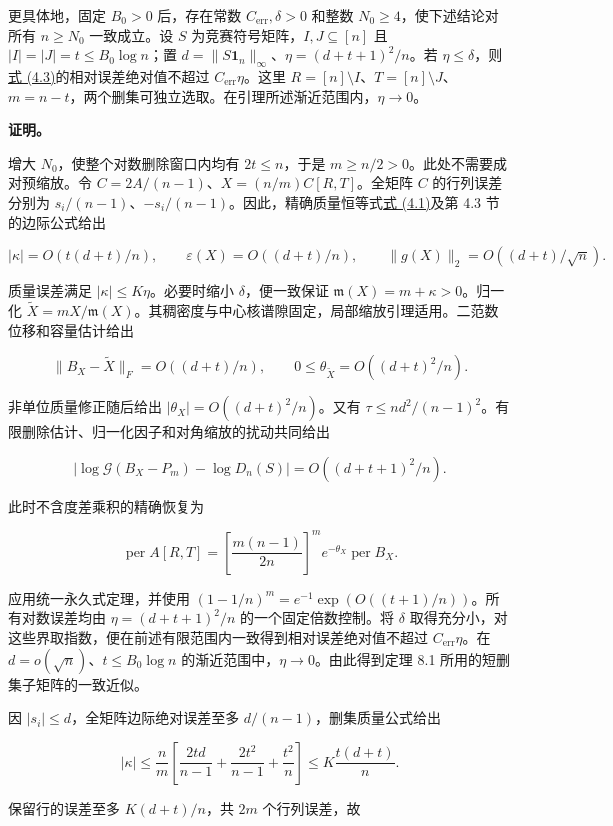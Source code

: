 \documentclass[11pt,a4paper]{article}
\begin{document}
更具体地，固定 \(B_0>0\) 后，存在常数 \(C_{\mathrm{err}},\delta>0\) 和整数 \(N_0\ge4\)，使下述结论对所有 \(n\ge N_0\) 一致成立。设 \(S\) 为竞赛符号矩阵，\(I,J\subseteq[n]\) 且 \(|I|=|J|=t\le B_0\log n\)；置 \(d=\|S\mathbf1_n\|_\infty\)、\(\eta=(d+t+1)^2/n\)。若 \(\eta\le\delta\)，则\hyperref[eq-small-score-permanent]{式 (4.3)}的相对误差绝对值不超过 \(C_{\mathrm{err}}\eta\)。这里 \(R=[n]\setminus I\)、\(T=[n]\setminus J\)、\(m=n-t\)，两个删集可独立选取。在引理所述渐近范围内，\(\eta\to0\)。

\textbf{证明。}

增大 \(N_0\)，使整个对数删除窗口内均有 \(2t\le n\)，于是 \(m\ge n/2>0\)。此处不需要成对预缩放。令 \(C=2A/(n-1)\)、\(X=(n/m)C[R,T]\)。全矩阵 \(C\) 的行列误差分别为 \(s_i/(n-1)\)、\(-s_i/(n-1)\)。因此，精确质量恒等式\hyperref[eq-deletion-mass]{式 (4.1)}及第 4.3 节的边际公式给出

\[
|\kappa|=O(t(d+t)/n),\qquad \varepsilon(X)=O((d+t)/n),\qquad \|g(X)\|_2=O((d+t)/\sqrt n).
\]

质量误差满足 \(|\kappa|\le K\eta\)。必要时缩小 \(\delta\)，便一致保证 \(\mathfrak m(X)=m+\kappa>0\)。归一化 \(\widetilde X=mX/\mathfrak m(X)\)。其稠密度与中心核谱隙固定，局部缩放引理适用。二范数位移和容量估计给出

\[
\|B_X-\widetilde X\|_F=O((d+t)/n),\qquad 0\le\theta_{\widetilde X}=O((d+t)^2/n).
\]

非单位质量修正随后给出 \(|\theta_X|=O((d+t)^2/n)\)。又有 \(\tau\le nd^2/(n-1)^2\)。有限删除估计、归一化因子和对角缩放的扰动共同给出

\[
|\log\mathcal G(B_X-P_m)-\log D_n(S)|=O((d+t+1)^2/n).
\]

此时不含度差乘积的精确恢复为

\[
\operatorname{per}A[R,T]=\left[\frac{m(n-1)}{2n}\right]^m e^{-\theta_X}\operatorname{per}B_X.
\]

应用统一永久式定理，并使用 \((1-1/n)^m=e^{-1}\exp(O((t+1)/n))\)。所有对数误差均由 \(\eta=(d+t+1)^2/n\) 的一个固定倍数控制。将 \(\delta\) 取得充分小，对这些界取指数，便在前述有限范围内一致得到相对误差绝对值不超过 \(C_{\mathrm{err}}\eta\)。在 \(d=o(\sqrt n)\)、\(t\le B_0\log n\) 的渐近范围中，\(\eta\to0\)。由此得到定理 8.1 所用的短删集子矩阵的一致近似。

因 \(|s_i|\le d\)，全矩阵边际绝对误差至多 \(d/(n-1)\)，删集质量公式给出

\[
|\kappa|\le\frac nm\left[\frac{2td}{n-1}+\frac{2t^2}{n-1}+\frac{t^2}n\right]
\le K\frac{t(d+t)}n.
\]

保留行的误差至多 \(K(d+t)/n\)，共 \(2m\) 个行列误差，故
\end{document}
